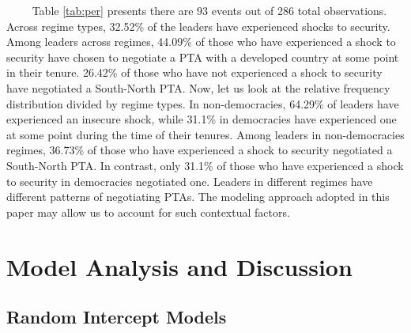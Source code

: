 \documentclass[12pt,]{article}
\begin{document}
\begin{table}

\caption{\label{tab:xtable print pvalues}\label{tab:per} Percentages of Leaders being Treated and those Trated Having an Event}
\centering
{}
\end{table}

\(\qquad\) Table \ref{tab:per} presents there are 93 events out of 286
total observations. Across regime types, 32.52\% of the leaders have
experienced shocks to security. Among leaders across regimes, 44.09\% of
those who have experienced a shock to security have chosen to negotiate
a PTA with a developed country at some point in their tenure. 26.42\% of
those who have not experienced a shock to security have negotiated a
South-North PTA. Now, let us look at the relative frequency distribution
divided by regime types. In non-democracies, 64.29\% of leaders have
experienced an insecure shock, while 31.1\% in democracies have
experienced one at some point during the time of their tenures. Among
leaders in non-democracies regimes, 36.73\% of those who have
experienced a shock to security negotiated a South-North PTA. In
contrast, only 31.1\% of those who have experienced a shock to security
in democracies negotiated one. Leaders in different regimes have
different patterns of negotiating PTAs. The modeling approach adopted in
this paper may allow us to account for such contextual factors.

\section{Model Analysis and
Discussion}\label{model-analysis-and-discussion}

\subsection{Random Intercept Models}\label{random-intercept-models}
\end{document}
